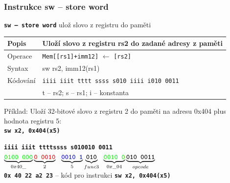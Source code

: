 \begin{frame}
\frametitle{Instrukce sw -- store word}

\textbf{\texttt{sw -- store word}} ulož slovo z registru do paměti

\bigskip

\begin{tabular}{|l|l|}\hline
Popis & Uloží slovo z registru rs2 do zadané adresy z paměti \\ \hline
Operace & \texttt{Mem[[rs1]+imm12]} $\leftarrow$ \texttt{[rs2]} \\ \hline
Syntax & sw rs2, imm12(rs1) \\ \hline
Kódování & \texttt{iiii iiit tttt ssss s010 iiii i010 0011} \\ 
 & t -- rs2; s -- rs1; i -- konstanta \\ \hline
\end{tabular}

\bigskip

Příklad: Uloží 32-bitové slovo z registru 2 do paměti na adresu 0x404 plus hodnota registru 5:\\
\textbf{\texttt{sw x2, 0x404(x5)}}

\textbf{\texttt{{\color{green}iiii iii}\hspace{0.08cm}\color{red}t tttt}}\phantom{x}\hspace{0.13cm}\textbf{\texttt{\color{blue}ssss s}}\hspace{0.1cm}\textbf{\texttt{010\hspace{0.05cm}010 0011}}\\
$\underbrace{\textbf{\texttt{\color{green}0100 000}}}_{0x40\_}
\underbrace{\textbf{\texttt{\color{red}0 0010}}}_{2}
\texttt{ }\underbrace{\textbf{\texttt{\color{blue}0010 1}}}_{5}
\underbrace{\textbf{\texttt{010}}}_{func3}\phantom{i}\underbrace{\textbf{\texttt{\color{green}0010 0}}}_{0x \_04}
\underbrace{\textbf{\texttt{010 0011}}}_{opcode}$\\

\textbf{\texttt{0x 40 22 a2 23}} -- kód pro instrukci \textbf{\texttt{sw x2, 0x404(x5)}}

\end{frame}

